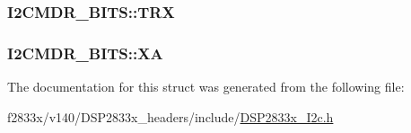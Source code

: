 \subsubsection[{T\+R\+X}]{ I2\+C\+M\+D\+R\+\_\+\+B\+I\+T\+S\+::\+T\+R\+X}\label{struct_i2_c_m_d_r___b_i_t_s_af2b3476fe6b04a481e6d5af6f620f549}
\hypertarget{struct_i2_c_m_d_r___b_i_t_s_ac560243766d253956acde7c62ec8a12e}{}
\subsubsection[{X\+A}]{ I2\+C\+M\+D\+R\+\_\+\+B\+I\+T\+S\+::\+X\+A}\label{struct_i2_c_m_d_r___b_i_t_s_ac560243766d253956acde7c62ec8a12e}


The documentation for this struct was generated from the following file\+:\begin{DoxyCompactItemize}
\item 
f2833x/v140/\+D\+S\+P2833x\+\_\+headers/include/\hyperlink{_d_s_p2833x___i2c_8h}{D\+S\+P2833x\+\_\+\+I2c.\+h}\end{DoxyCompactItemize}
